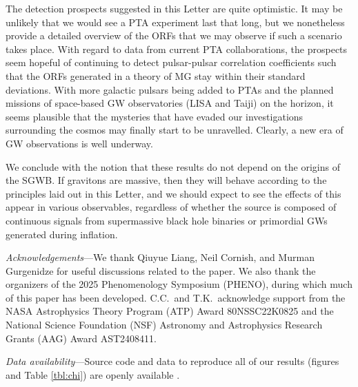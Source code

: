 \documentclass[prd,twocolumn,aps,psfig,nofootinbib,nobibnotes,superscriptaddress,preprintnumbers,times]{revtex4-2}
\begin{document}
The detection prospects suggested in this Letter are quite optimistic. It may be unlikely that we would see a PTA experiment last that long, but we nonetheless provide a detailed overview of the ORFs that we may observe if such a scenario takes place. With regard to data from current PTA collaborations, the prospects seem hopeful of continuing to detect pulsar-pulsar correlation coefficients such that the ORFs generated in a theory of MG stay within their standard deviations. With more galactic pulsars being added to PTAs and the planned missions of space-based GW observatories (LISA and Taiji) on the horizon, it seems plausible that the mysteries that have evaded our investigations surrounding the cosmos may finally start to be unravelled. Clearly, a new era of GW observations is well underway. 

We conclude with the notion that these results do not depend on the origins of the SGWB. If gravitons are massive, then they will behave according to the principles laid out in this Letter, and we should expect to see the effects of this appear in various observables, regardless of whether the source is composed of continuous signals from supermassive black hole binaries or primordial GWs generated during inflation.

\vspace{5mm}
\textit{Acknowledgements}---We thank Qiuyue Liang, Neil Cornish, and Murman Gurgenidze for useful discussions related to the paper. We also thank the organizers of the 2025 Phenomenology Symposium (PHENO), during which much of this paper has been developed. C.C.\ and T.K.\ acknowledge support from the NASA Astrophysics Theory Program (ATP) Award 80NSSC22K0825 and the National Science Foundation (NSF) Astronomy and Astrophysics Research Grants (AAG) Award AST2408411.

\vspace{5mm}
\textit{Data availability}---Source code and data to reproduce all of our results (figures and Table \ref{tbl:chi}) are openly available \cite{Choi:2025git}.





\clearpage
\end{document}
